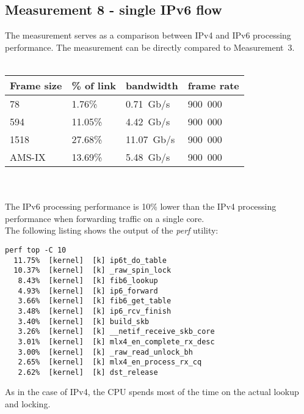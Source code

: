 
\subsection{Measurement 8 - single IPv6 flow}
The measurement serves as a comparison between IPv4 and IPv6 processing performance.
The measurement can be directly compared to Measurement~3.
\\
\\
\begin{tabular}{ | l | l | l | l |}
\hline
Frame size & \% of link & bandwidth & frame rate \\
\hline
78     &  1.76\% &  0.71~Gb/s & 900~000 \\
594    & 11.05\% &  4.42~Gb/s & 900~000 \\
1518   & 27.68\% & 11.07~Gb/s & 900~000 \\
AMS-IX & 13.69\% &  5.48~Gb/s & 900~000 \\
\hline
\end{tabular}
\\
\\
The IPv6 processing performance is 10\% lower than the IPv4 processing performance
when forwarding traffic on a single core.
\\
The following listing shows the output of the {\it{perf}} utility:
\begin{lstlisting}
perf top -C 10
  11.75%  [kernel]  [k] ip6t_do_table
  10.37%  [kernel]  [k] _raw_spin_lock
   8.43%  [kernel]  [k] fib6_lookup
   4.93%  [kernel]  [k] ip6_forward
   3.66%  [kernel]  [k] fib6_get_table
   3.48%  [kernel]  [k] ip6_rcv_finish
   3.40%  [kernel]  [k] build_skb
   3.26%  [kernel]  [k] __netif_receive_skb_core
   3.01%  [kernel]  [k] mlx4_en_complete_rx_desc
   3.00%  [kernel]  [k] _raw_read_unlock_bh
   2.65%  [kernel]  [k] mlx4_en_process_rx_cq
   2.62%  [kernel]  [k] dst_release
\end{lstlisting}
As in the case of IPv4, the CPU spends most of the time on the actual lookup and locking.
